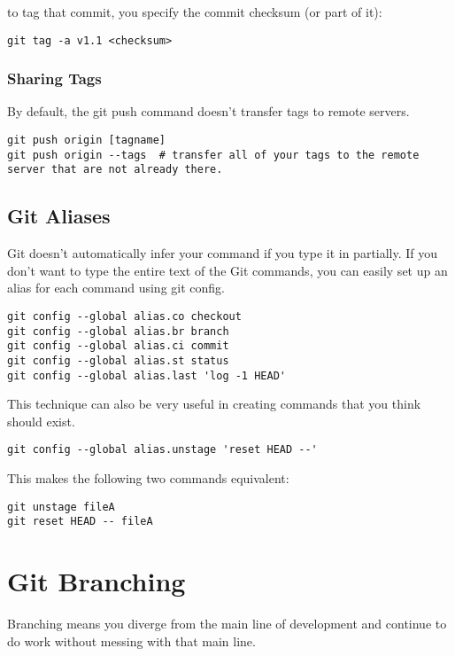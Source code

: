 \documentclass[11pt]{article}
\begin{document}
to tag that commit, you specify the commit checksum (or part of it):\\
\begin{verbatim}
git tag -a v1.1 <checksum>
\end{verbatim}



\subsubsection{Sharing Tags}
\label{sec:org45d9313}
By default, the git push command doesn't transfer tags to remote servers.\\

\begin{verbatim}
git push origin [tagname]
git push origin --tags  # transfer all of your tags to the remote server that are not already there.
\end{verbatim}



\subsection{Git Aliases}
\label{sec:orgd6df188}
Git doesn't automatically infer your command if you type it in partially. If you don't want to type the entire text of the Git commands, you can easily set up an alias for each command using git config.\\
\begin{verbatim}
git config --global alias.co checkout
git config --global alias.br branch
git config --global alias.ci commit
git config --global alias.st status
git config --global alias.last 'log -1 HEAD'
\end{verbatim}

This technique can also be very useful in creating commands that you think should exist.\\
\begin{verbatim}
git config --global alias.unstage 'reset HEAD --'
\end{verbatim}

This makes the following two commands equivalent:\\
\begin{verbatim}
git unstage fileA
git reset HEAD -- fileA
\end{verbatim}


\section{Git Branching}
\label{sec:org4475f22}
Branching means you diverge from the main line of development and continue to do work without messing with that main line.\\
\end{document}
